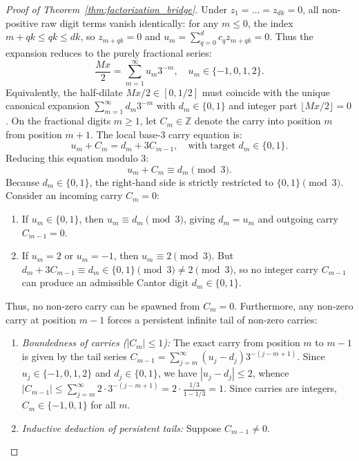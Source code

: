 \documentclass[11pt,reqno]{amsart}
\theoremstyle{plain}
\theoremstyle{definition}
\theoremstyle{remark}
\newcommand{\Z}{\mathbb{Z}}
\begin{document}
\begin{proof}[Proof of Theorem~\ref{thm:factorization_bridge}]
Under $z_1 = \dots = z_{dk} = 0$, all non-positive raw digit terms vanish identically: for any $m \le 0$, the index $m + qk \le qk \le dk$, so $z_{m + qk} = 0$ and $u_m = \sum_{q=0}^d c_q z_{m+qk} = 0$. Thus the expansion reduces to the purely fractional series:
\begin{equation}
\frac{M x}{2} = \sum_{m=1}^\infty u_m 3^{-m}, \quad u_m \in \{-1, 0, 1, 2\}.
\end{equation}
Equivalently, the half-dilate $M x / 2 \in [0, 1/2]$ must coincide with the unique canonical expansion $\sum_{m=1}^\infty d_m 3^{-m}$ with $d_m \in \{0, 1\}$ and integer part $\lfloor M x / 2 \rfloor = 0$. On the fractional digits $m \ge 1$, let $C_m \in \Z$ denote the carry into position $m$ from position $m+1$. The local base-$3$ carry equation is:
\begin{equation}
u_m + C_m = d_m + 3 C_{m-1}, \quad \text{with target } d_m \in \{0, 1\}.
\end{equation}
Reducing this equation modulo $3$:
\begin{equation}
u_m + C_m \equiv d_m \pmod 3.
\end{equation}
Because $d_m \in \{0, 1\}$, the right-hand side is strictly restricted to $\{0, 1\} \pmod 3$. Consider an incoming carry $C_m = 0$:
\begin{enumerate}
    \item If $u_m \in \{0, 1\}$, then $u_m \equiv d_m \pmod 3$, giving $d_m = u_m$ and outgoing carry $C_{m-1} = 0$.
    \item If $u_m = 2$ or $u_m = -1$, then $u_m \equiv 2 \pmod 3$. But $d_m + 3 C_{m-1} \equiv d_m \in \{0, 1\} \pmod 3 \ne 2 \pmod 3$, so no integer carry $C_{m-1}$ can produce an admissible Cantor digit $d_m \in \{0, 1\}$.
\end{enumerate}
Thus, no non-zero carry can be spawned from $C_m = 0$.
Furthermore, any non-zero carry at position $m-1$ forces a persistent infinite tail of non-zero carries:
\begin{enumerate}
    \item \emph{Boundedness of carries ($|C_m| \le 1$):} The exact carry from position $m$ to $m-1$ is given by the tail series $C_{m-1} = \sum_{j=m}^\infty (u_j - d_j) 3^{-(j-m+1)}$. Since $u_j \in \{-1, 0, 1, 2\}$ and $d_j \in \{0, 1\}$, we have $|u_j - d_j| \le 2$, whence $|C_{m-1}| \le \sum_{j=m}^\infty 2 \cdot 3^{-(j-m+1)} = 2 \cdot \frac{1/3}{1 - 1/3} = 1$. Since carries are integers, $C_m \in \{-1, 0, 1\}$ for all $m$.
    \item \emph{Inductive deduction of persistent tails:} Suppose $C_{m-1} \ne 0$.

\end{enumerate}
\end{proof}
\end{document}
